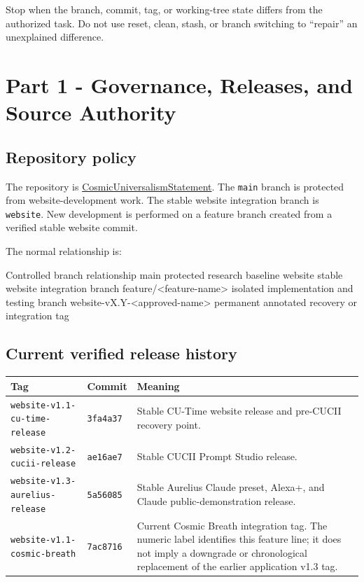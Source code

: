\documentclass[11pt,letterpaper]{article}
\newcommand{\RepositoryName}{CosmicUniversalismStatement}
\newcommand{\RepositoryURL}{https://github.com/willmaddock/CosmicUniversalismStatement}
\newcommand{\branchname}[1]{\texttt{#1}}
\newcommand{\release}[1]{\texttt{#1}}
\begin{document}
\begin{warningbox}
Stop when the branch, commit, tag, or working-tree state differs from the
authorized task. Do not use reset, clean, stash, or branch switching to
``repair'' an unexplained difference.
\end{warningbox}

\section{Part 1 - Governance, Releases, and Source Authority}

\subsection{Repository policy}

The repository is \href{\RepositoryURL}{\RepositoryName}. The
\branchname{main} branch is protected from website-development work. The
stable website integration branch is \branchname{website}. New development is
performed on a feature branch created from a verified stable website commit.

The normal relationship is:

\begin{codebox}{Controlled branch relationship}
main                         protected research baseline
website                      stable website integration branch
feature/<feature-name>       isolated implementation and testing branch
website-vX.Y-<approved-name> permanent annotated recovery or integration tag
\end{codebox}

\subsection{Current verified release history}

\begin{tabularx}{\textwidth}{L{2.35in}L{1.0in}Y}
\toprule
\textbf{Tag} & \textbf{Commit} & \textbf{Meaning} \\
\midrule
\release{website-v1.1-cu-time-release} & \release{3fa4a37} & Stable CU-Time website release and pre-CUCII recovery point. \\
\release{website-v1.2-cucii-release} & \release{ae16ae7} & Stable CUCII Prompt Studio release. \\
\release{website-v1.3-aurelius-release} & \release{5a56085} & Stable Aurelius Claude preset, Alexa+, and Claude public-demonstration release. \\
\release{website-v1.1-cosmic-breath} & \release{7ac8716} & Current Cosmic Breath integration tag. The numeric label identifies this feature line; it does not imply a downgrade or chronological replacement of the earlier application v1.3 tag. \\
\bottomrule
\end{tabularx}
\end{document}
